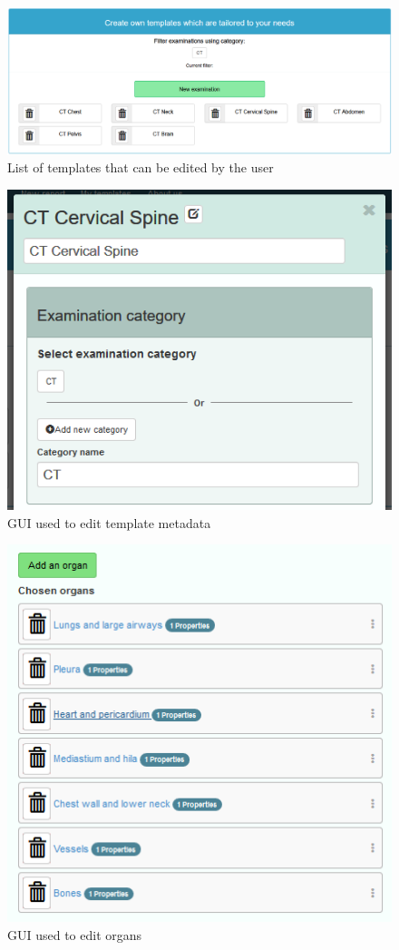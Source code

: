 \documentclass[12pt, twoside, openany]{report}
\theoremstyle{definition}
\begin{document}
\begin{figure}
    \centering
    \includegraphics[width=0.9\linewidth]{templates-list}
    \caption{List of templates that can be edited by the user\label{fig:templates-list}}
\end{figure}
\begin{figure}
    \centering
    \includegraphics{template-metadata}
    \caption{GUI used to edit template metadata \label{fig:template-metadata}}
\end{figure}
\begin{figure}
    \centering
    \includegraphics{template-organs-list}
    \caption{GUI used to edit organs \label{fig:template-organs-list}}
\end{figure}
\end{document}
